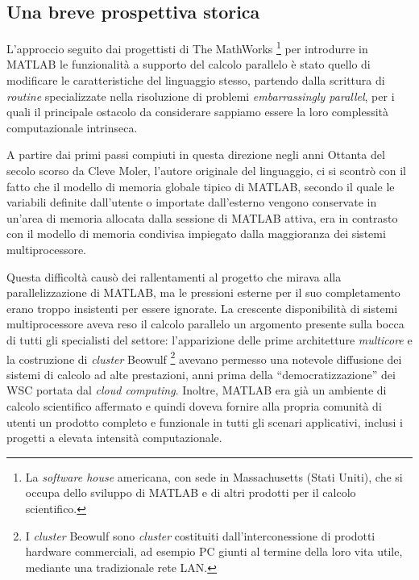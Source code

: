 \subsection{Una breve prospettiva storica}
L'approccio seguito dai progettisti di The MathWorks \footnote{La \textit{software house} americana, con sede in Massachusetts (Stati Uniti), che si occupa dello sviluppo di MATLAB e di altri prodotti per il calcolo scientifico.}
per introdurre in MATLAB le funzionalit\`a a supporto del calcolo parallelo \`e stato quello di modificare le caratteristiche del linguaggio 
stesso, partendo dalla scrittura di \textit{routine} specializzate nella risoluzione di problemi \textit{embarrassingly parallel}, per i quali il principale ostacolo da considerare
sappiamo essere la loro complessit\`a computazionale intrinseca. 

A partire dai primi passi compiuti in questa direzione negli anni Ottanta del secolo scorso da Cleve Moler, l'autore originale del linguaggio, ci si scontr\`o 
con il fatto che il modello di memoria globale tipico di MATLAB, secondo il quale le variabili definite dall'utente o importate dall'esterno vengono conservate 
in un'area di memoria allocata dalla sessione di MATLAB attiva, era in contrasto con il modello di memoria condivisa impiegato dalla maggioranza dei sistemi 
multiprocessore.

Questa difficoltà causò dei rallentamenti al progetto che mirava alla parallelizzazione di MATLAB, ma le pressioni esterne per il suo completamento erano troppo insistenti per essere ignorate.\newline
La crescente disponibilit\`a di sistemi multiprocessore aveva reso il calcolo parallelo un argomento presente sulla bocca di tutti gli specialisti del 
settore: l'apparizione delle prime architetture \textit{multicore} e la costruzione di \textit{cluster} Beowulf \footnote{I \textit{cluster} Beowulf sono \textit{cluster} costituiti dall'interconessione di prodotti hardware commerciali, ad esempio PC giunti al termine della loro vita utile, mediante una tradizionale rete LAN. } avevano permesso una notevole diffusione dei sistemi di calcolo ad alte prestazioni, anni prima della \enquote{democratizzazione} dei WSC portata dal \textit{cloud computing}.\newline   
Inoltre, MATLAB era gi\`a un ambiente di calcolo scientifico affermato e quindi doveva fornire alla propria comunit\`a di utenti un prodotto completo e funzionale 
in tutti gli scenari applicativi, inclusi i progetti a elevata intensit\`a computazionale.

